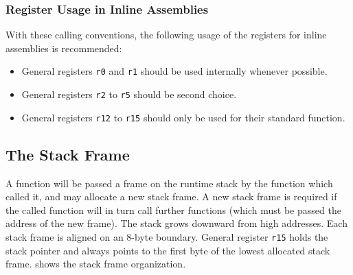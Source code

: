 \documentclass[english,11pt,twoside,toc=bib,toc=idx]{scrreprt}
\begin{document}
\subsubsection{Register Usage in Inline Assemblies}

With these calling conventions, the following usage of the registers
for inline assemblies is recommended:
\begin{itemize}
\item General registers \texttt{r0} and \texttt{r1} should be used
  internally whenever possible.
\item General registers \texttt{r2} to \texttt{r5} should be second
  choice.
\item General registers \texttt{r12} to \texttt{r15} should only be
  used for their standard function.
\end{itemize}

\subsection{The Stack Frame}
\label{stackframe}

A function will be passed a frame on the runtime stack by the function
which called it, and may allocate a new stack frame.  A new stack frame is
required if the called function will in turn call further functions (which
must be passed the address of the new frame).  The stack grows downward
from high addresses.  Each stack frame is aligned on an 8-byte boundary.
General register \texttt{r15} holds the stack pointer and always
points to the first byte of the lowest allocated stack frame.
 shows the stack frame organization.
\end{document}
